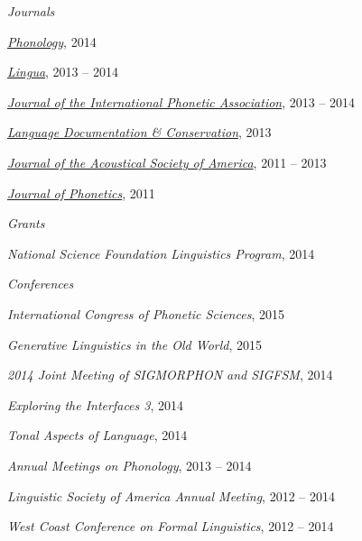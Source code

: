 \documentclass[10pt]{article}
\begin{document}
\begin{outerlist}

    \item[] \textit{Journals}%

      \begin{innerlist}
      \item \href{http://journals.cambridge.org/action/displayJournal?jid=PHO}{\emph{Phonology}}, 2014
      \item \href{http://www.journals.elsevier.com/lingua/}{\emph{Lingua}}, 2013 -- 2014
        \item
          \href{http://journals.cambridge.org/action/displayJournal?jid=IPA}{\emph{Journal
              of the International Phonetic Association}}, 2013 -- 2014
        \item \href{http://nflrc.hawaii.edu/ldc/}{\emph{Language Documentation \& Conservation}}, 2013
        \item \href{http://asadl.org/jasa/}{\emph{Journal of the Acoustical Society of America}}, 2011 -- 2013
        \item \href{http://www.journals.elsevier.com/journal-of-phonetics/}{\emph{Journal of Phonetics}}, 2011
      \end{innerlist}

    \item[] \textit{Grants}%

      \begin{innerlist}
      \item \emph{National Science Foundation Linguistics Program}, 2014
      \end{innerlist}

    \item[] \textit{Conferences}%

      \begin{innerlist}
      \item \emph{International Congress of Phonetic Sciences}, 2015
      \item \emph{Generative Linguistics in the Old World}, 2015
      \item \emph{2014 Joint Meeting of SIGMORPHON and SIGFSM}, 2014
      \item \emph{Exploring the Interfaces 3}, 2014
        \item \emph{Tonal Aspects of Language}, 2014
        \item \emph{Annual Meetings on Phonology}, 2013 -- 2014
        \item \emph{Linguistic Society of America Annual Meeting},
          2012 -- 2014
        \item \emph{West Coast Conference on Formal Linguistics}, 2012 -- 2014
      \end{innerlist}

\end{outerlist}
\end{document}
